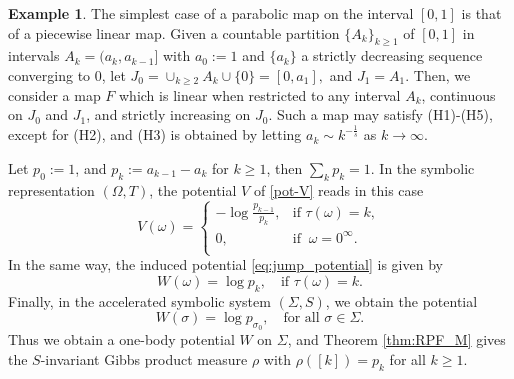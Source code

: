 \documentclass{amsart}
\theoremstyle{definition}
\theoremstyle{remark}
\theoremstyle{definition}
\newtheorem{example}[theorem]{Example}
\numberwithin{equation}{section}
\begin{document}
\begin{example} \label{ex:pl}
The simplest case of a parabolic map on the interval $[0,1]$ is that of a piecewise linear map. Given a countable partition $\{A_k\}_{k\ge 1}$ of $[0,1]$ in intervals $A_k=(a_k,a_{k-1}]$ with $a_0:=1$ and $\{a_k\}$ a strictly decreasing sequence converging to $0$, let $J_0 =   \cup_{k\ge 2} A_k \cup \{0\}= [0,a_1],$ and $J_1= A_1$. Then, we consider a map $F$ which is linear when restricted to any interval $A_k$, continuous on $J_0$ and $J_1$, and strictly increasing on $J_0$. Such a map may satisfy (H1)-(H5), except for (H2), and (H3) is obtained by letting $a_k \sim k^{-\frac 1s}$ as $k\to \infty$.

Let $p_0:=1$, and $p_k := a_{k-1}-a_k$ for $k\ge 1$, then $\sum_k p_k=1$. In the symbolic representation $(\Omega,T)$, the potential $V$ of \eqref{pot-V} reads in this case
\[
V(\omega) = \begin{cases}
    - \log \frac{p_{k-1}}{p_k}, &\text{if $\tau(\omega)=k$},\\
    0, &\text{if }\ \omega = 0^{\infty}.\\
\end{cases}
\]
In the same way, the induced potential \eqref{eq:jump_potential} is given by
\[
W(\omega) = \log p_k,\quad \text{if $\tau(\omega)=k$.}
\]
Finally, in the accelerated symbolic system $(\Sigma,S)$, we obtain the potential 
\[
W(\sigma) = \log p_{\sigma_0}, \quad \text{for all $\sigma \in \Sigma.$}
\]
Thus we obtain a one-body potential $W$ on $\Sigma$, and Theorem \ref{thm:RPF_M} gives the $S$-invariant Gibbs product measure $\rho$ with $\rho([k]) = p_k$ for all $k\ge 1$.


\end{example}
\end{document}
